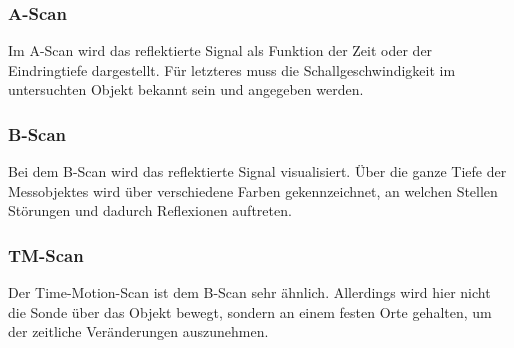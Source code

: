 \subsubsection*{A-Scan}
Im A-Scan wird das reflektierte Signal als Funktion der Zeit oder der Eindringtiefe dargestellt. Für letzteres muss die Schallgeschwindigkeit im untersuchten Objekt bekannt sein und angegeben werden.
\subsubsection*{B-Scan}
Bei dem B-Scan wird das reflektierte Signal visualisiert. Über die ganze Tiefe der Messobjektes wird über verschiedene Farben gekennzeichnet, an welchen Stellen Störungen und dadurch Reflexionen auftreten.
\subsubsection*{TM-Scan}
Der Time-Motion-Scan ist dem B-Scan sehr ähnlich. Allerdings wird hier nicht die Sonde über das Objekt bewegt, sondern an einem festen Orte gehalten, um der zeitliche Veränderungen auszunehmen.